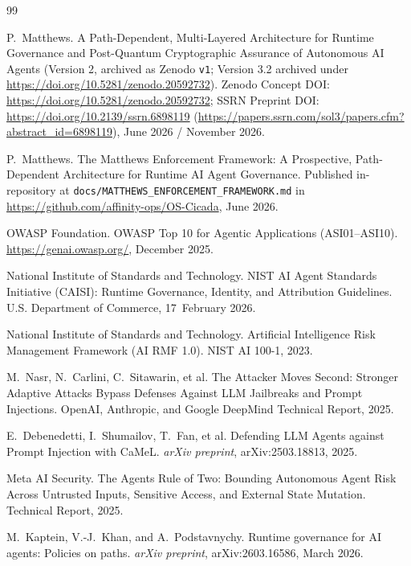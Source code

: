 \documentclass[11pt, a4paper]{article}
\begin{document}
\begin{thebibliography}{99}

P.~Matthews.
\newblock A Path-Dependent, Multi-Layered Architecture for Runtime Governance and Post-Quantum Cryptographic Assurance of Autonomous AI Agents (Version 2, archived as Zenodo \texttt{v1}; Version 3.2 archived under \url{https://doi.org/10.5281/zenodo.20592732}).
\newblock Zenodo Concept DOI: \url{https://doi.org/10.5281/zenodo.20592732}; SSRN Preprint DOI: \url{https://doi.org/10.2139/ssrn.6898119} (\url{https://papers.ssrn.com/sol3/papers.cfm?abstract_id=6898119}), June 2026 / November 2026.

P.~Matthews.
\newblock The Matthews Enforcement Framework: A Prospective, Path-Dependent Architecture for Runtime AI Agent Governance.
\newblock Published in-repository at \texttt{docs/MATTHEWS\_ENFORCEMENT\_FRAMEWORK.md} in \url{https://github.com/affinity-ops/OS-Cicada}, June 2026.

OWASP Foundation.
\newblock OWASP Top 10 for Agentic Applications (ASI01--ASI10).
\newblock \url{https://genai.owasp.org/}, December 2025.

National Institute of Standards and Technology.
\newblock NIST AI Agent Standards Initiative (CAISI): Runtime Governance, Identity, and Attribution Guidelines.
\newblock U.S. Department of Commerce, 17~February 2026.

National Institute of Standards and Technology.
\newblock Artificial Intelligence Risk Management Framework (AI RMF 1.0).
\newblock NIST AI 100-1, 2023.

M.~Nasr, N.~Carlini, C.~Sitawarin, et al.
\newblock The Attacker Moves Second: Stronger Adaptive Attacks Bypass Defenses Against LLM Jailbreaks and Prompt Injections.
\newblock OpenAI, Anthropic, and Google DeepMind Technical Report, 2025.

E.~Debenedetti, I.~Shumailov, T.~Fan, et al.
\newblock Defending LLM Agents against Prompt Injection with CaMeL.
\newblock \textit{arXiv preprint}, arXiv:2503.18813, 2025.

Meta AI Security.
\newblock The Agents Rule of Two: Bounding Autonomous Agent Risk Across Untrusted Inputs, Sensitive Access, and External State Mutation.
\newblock Technical Report, 2025.

M.~Kaptein, V.-J.~Khan, and A.~Podstavnychy.
\newblock Runtime governance for AI agents: Policies on paths.
\newblock \textit{arXiv preprint}, arXiv:2603.16586, March 2026.


\end{thebibliography}
\end{document}
